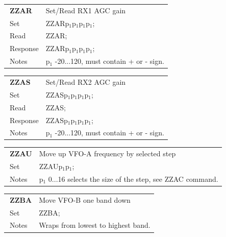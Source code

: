 \documentclass[12pt]{book}
\begin{document}
\begin{center}
\begin{tabular}{|p{2cm}|p{11cm}|}
\toprule
$\phantom{\Big|}$\textbf{\large ZZAR} & Set/Read RX1 AGC gain \\\cline{1-2}
$\phantom{\Big|}${\large Set} & {ZZARp$_1$p$_1$p$_1$p$_1$;} \\\hline
$\phantom{\Big|}${\large Read} & {ZZAR;} \\\hline
$\phantom{\Big|}${\large Response} & {ZZARp$_1$p$_1$p$_1$p$_1$;} \\\hline
$\phantom{\Big|}${\large Notes} & \multicolumn{1}{|p{11cm}|}{p$_1$ -20...120, must contain + or - sign.} \\
\bottomrule
\end{tabular}
\end{center}

\begin{center}
\begin{tabular}{|p{2cm}|p{11cm}|}
\toprule
$\phantom{\Big|}$\textbf{\large ZZAS} & Set/Read RX2 AGC gain \\\cline{1-2}
$\phantom{\Big|}${\large Set} & {ZZASp$_1$p$_1$p$_1$p$_1$;} \\\hline
$\phantom{\Big|}${\large Read} & {ZZAS;} \\\hline
$\phantom{\Big|}${\large Response} & {ZZASp$_1$p$_1$p$_1$p$_1$;} \\\hline
$\phantom{\Big|}${\large Notes} & \multicolumn{1}{|p{11cm}|}{p$_1$ -20...120, must contain + or - sign.} \\
\bottomrule
\end{tabular}
\end{center}

\begin{center}
\begin{tabular}{|p{2cm}|p{11cm}|}
\toprule
$\phantom{\Big|}$\textbf{\large ZZAU} & Move up VFO-A frequency by selected step \\\cline{1-2}
$\phantom{\Big|}${\large Set} & {ZZAUp$_1$p$_1$;} \\\hline
$\phantom{\Big|}${\large Notes} & \multicolumn{1}{|p{11cm}|}{p$_1$ 0...16 selects the size of the step, see ZZAC command.} \\
\bottomrule
\end{tabular}
\end{center}

\begin{center}
\begin{tabular}{|p{2cm}|p{11cm}|}
\toprule
$\phantom{\Big|}$\textbf{\large ZZBA} & Move VFO-B one band down \\\cline{1-2}
$\phantom{\Big|}${\large Set} & {ZZBA;} \\\hline
$\phantom{\Big|}${\large Notes} & \multicolumn{1}{|p{11cm}|}{Wraps from lowest to highest band.} \\
\bottomrule
\end{tabular}
\end{center}
\end{document}
